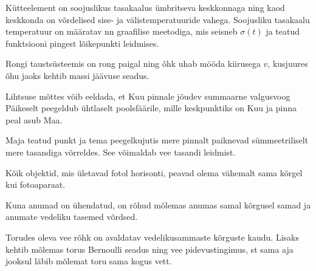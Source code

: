 \documentclass[10pt, twoside]{article}
\begin{document}
{%

\hint
Kütteelement on soojuslikus tasakaalus ümbritseva keskkonnaga ning kaod keskkonda on võrdelised sise- ja välistemperatuuride vahega. Soojusliku tasakaalu temperatuur on määratav nn graafilise meetodiga, mis seisneb $\sigma (t)$ ja teatud funktsiooni pingest lõikepunkti leidmises.
\probend
\bigskip


\hint
Rongi taustsüsteemis on rong paigal ning õhk uhab mööda kiirusega $v$, kusjuures õhu jaoks kehtib massi jäävuse seadus.
\probend
\bigskip


\hint
Lihtsuse mõttes võib eeldada, et Kuu pinnale jõudev summaarne valgusvoog Päikeselt peegeldub ühtlaselt poolsfäärile, mille keskpunktiks on Kuu ja pinna peal asub Maa.
\probend
\bigskip


\hint
Maja teatud punkt ja tema peegelkujutis mere pinnalt paiknevad sümmeetriliselt mere tasandiga võrreldes. See võimaldab vee tasandi leidmist.
\probend
\bigskip


\hint
Kõik objektid, mis ületavad fotol horisonti, peavad olema vähemalt sama kõrgel kui fotoaparaat.
\probend
\bigskip


\hint
Kuna anumad on ühendatud, on rõhud mõlemas anumas samal kõrgusel samad ja anumate vedeliku tasemed võrdsed.
\probend
\bigskip


\hint
Torudes oleva vee rõhk on avaldatav vedelikusammaste kõrguste kaudu. Lisaks kehtib mõlemas torus Bernoulli seadus ning vee pidevustingimus, st sama aja jooksul läbib mõlemat toru sama kogus vett.
\probend
\bigskip

}
\end{document}
